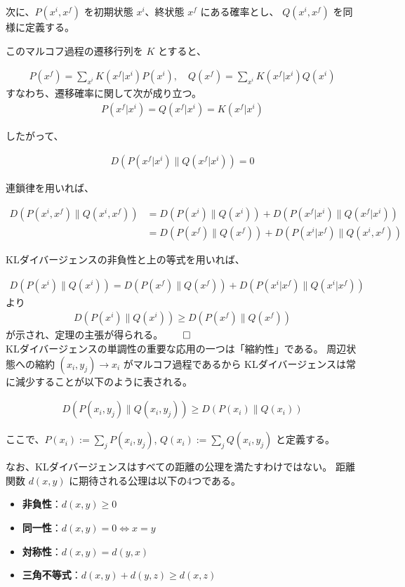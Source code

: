 \documentclass[a4paper,11pt]{jsarticle}
\numberwithin{equation}{section}
\begin{document}
次に、$P(x^i, x^f)$ を初期状態 $x^i$、終状態 $x^f$ にある確率とし、
$Q(x^i, x^f)$ を同様に定義する。

このマルコフ過程の遷移行列を $K$ とすると、

\begin{align}
P(x^f) = \sum_{x^i} K(x^f | x^i) P(x^i), \quad
Q(x^f) = \sum_{x^i} K(x^f | x^i) Q(x^i)
\end{align}
すなわち、遷移確率に関して次が成り立つ。
\begin{align}
P(x^f | x^i) = Q(x^f | x^i) = K(x^f | x^i)
\end{align}

したがって、

\begin{align}
D(P(x^f | x^i) \| Q(x^f | x^i)) = 0
\end{align}

連鎖律を用いれば、

\begin{align}
D(P(x^i, x^f) \| Q(x^i, x^f))
&= D(P(x^i) \| Q(x^i)) + D(P(x^f | x^i) \| Q(x^f | x^i)) \\
&= D(P(x^f) \| Q(x^f)) + D(P(x^i| x^f) \| Q(x^i, x^f))
\end{align}

KLダイバージェンスの非負性と上の等式を用いれば、

\begin{align}
    D(P(x^i) \| Q(x^i)) = D(P(x^f) \| Q(x^f)) + D(P(x^i | x^f) \| Q(x^i | x^f))
\end{align}
より
\begin{align}
D(P(x^i) \| Q(x^i)) \geq D(P(x^f) \| Q(x^f))
\end{align}
が示され、定理の主張が得られる。$\qed$\\

KLダイバージェンスの単調性の重要な応用の一つは「縮約性」である。
周辺状態への縮約 $(x_i, y_j) \to x_i$ がマルコフ過程であるから
KLダイバージェンスは常に減少することが以下のように表される。

\begin{align}
D(P(x_i, y_j) \| Q(x_i, y_j)) \geq D(P(x_i) \| Q(x_i))
\end{align}

ここで、$P(x_i) := \sum_j P(x_i, y_j)$, $Q(x_i) := \sum_j Q(x_i, y_j)$ と定義する。

なお、KLダイバージェンスはすべての距離の公理を満たすわけではない。
距離関数 $d(x, y)$ に期待される公理は以下の4つである。

\begin{itemize}
  \item \textbf{非負性}：$d(x, y) \geq 0$
  \item \textbf{同一性}：$d(x, y) = 0 \iff x = y$
  \item \textbf{対称性}：$d(x, y) = d(y, x)$
  \item \textbf{三角不等式}：$d(x, y) + d(y, z) \geq d(x, z)$
\end{itemize}
\end{document}
